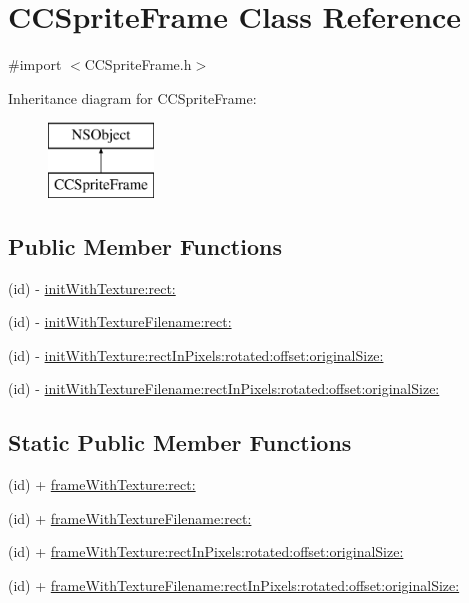 \hypertarget{interface_c_c_sprite_frame}{\section{C\-C\-Sprite\-Frame Class Reference}
\label{interface_c_c_sprite_frame}
}


{\ttfamily \#import $<$C\-C\-Sprite\-Frame.\-h$>$}

Inheritance diagram for C\-C\-Sprite\-Frame\-:\begin{figure}[H]
\begin{center}
\leavevmode
\includegraphics[height=2.000000cm]{interface_c_c_sprite_frame}
\end{center}
\end{figure}
\subsection*{Public Member Functions}
\begin{DoxyCompactItemize}
\item 
(id) -\/ \hyperlink{interface_c_c_sprite_frame_af8bce98fcf5dcd354d65735687343cf5}{init\-With\-Texture\-:rect\-:}
\item 
(id) -\/ \hyperlink{interface_c_c_sprite_frame_ab980f1670a4818ff59ad6900f1729ff7}{init\-With\-Texture\-Filename\-:rect\-:}
\item 
(id) -\/ \hyperlink{interface_c_c_sprite_frame_adfdb63e74246965ef35f37b61a542cd4}{init\-With\-Texture\-:rect\-In\-Pixels\-:rotated\-:offset\-:original\-Size\-:}
\item 
(id) -\/ \hyperlink{interface_c_c_sprite_frame_a2fa3b38c59f2526ae666ed4c49fa94f1}{init\-With\-Texture\-Filename\-:rect\-In\-Pixels\-:rotated\-:offset\-:original\-Size\-:}
\end{DoxyCompactItemize}
\subsection*{Static Public Member Functions}
\begin{DoxyCompactItemize}
\item 
(id) + \hyperlink{interface_c_c_sprite_frame_a3d33a9ddece7caa8c8384575c6c8f549}{frame\-With\-Texture\-:rect\-:}
\item 
(id) + \hyperlink{interface_c_c_sprite_frame_af542ec92bed1af72d0b5af14f6f53a01}{frame\-With\-Texture\-Filename\-:rect\-:}
\item 
(id) + \hyperlink{interface_c_c_sprite_frame_a88111a9fc32cf1cb947d0e9e37b8feca}{frame\-With\-Texture\-:rect\-In\-Pixels\-:rotated\-:offset\-:original\-Size\-:}
\item 
(id) + \hyperlink{interface_c_c_sprite_frame_a346e282819ba91eca110f029b35e21cc}{frame\-With\-Texture\-Filename\-:rect\-In\-Pixels\-:rotated\-:offset\-:original\-Size\-:}
\end{DoxyCompactItemize}
